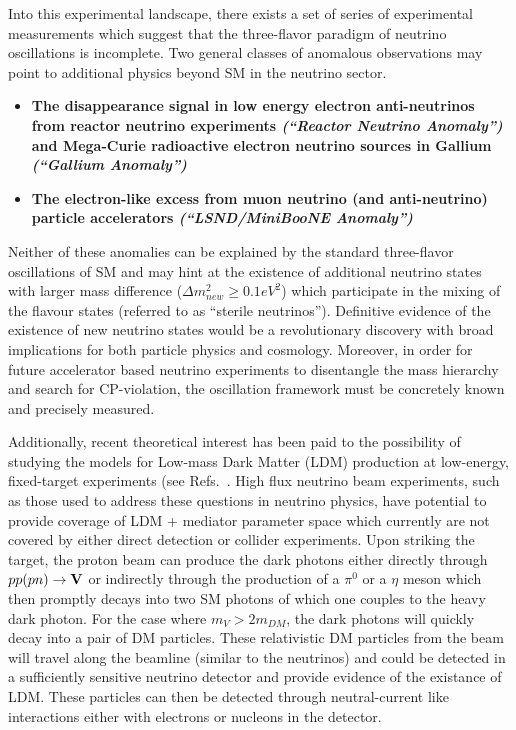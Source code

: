 Into this experimental landscape, there exists a set of series of experimental measurements which suggest that the three-flavor paradigm of neutrino oscillations is incomplete. Two general classes of anomalous observations may point to additional physics beyond SM  in the neutrino sector.

\begin{itemize}
\item \textbf{The disappearance signal in low energy electron anti-neutrinos from reactor neutrino experiments \cite{No13} \textit{(``Reactor Neutrino Anomaly'')} and Mega-Curie radioactive electron neutrino sources in Gallium \cite{No14, No15} \textit{(``Gallium Anomaly'')}}

\item \textbf{The electron-like excess from muon neutrino (and anti-neutrino) particle accelerators \textit{(``LSND/MiniBooNE Anomaly'')} \cite{No16, No17}}

\end{itemize}

Neither of these anomalies can be explained by the standard three-flavor oscillations of SM and may hint at the existence of additional neutrino states with larger mass difference ($\Delta m_{new}^{2}\geq 0.1 eV^{2}$) which participate in the mixing of the flavour states (referred to as ``sterile neutrinos''). Definitive evidence of the existence of new neutrino states would be a revolutionary discovery with broad implications for both particle physics and cosmology. Moreover, in order for future accelerator based neutrino experiments to disentangle the mass hierarchy and search for CP-violation, the oscillation framework must be concretely known and precisely measured.

Additionally, recent theoretical interest has been paid to the possibility of studying the models for Low-mass Dark Matter (LDM) production at low-energy, fixed-target experiments (see Refs.~\cite{if:ldm-1, if:ldm-2,if:ldm-3, if:ldm-4)}.  High flux neutrino beam experiments, such as those used to address these questions in neutrino physics, have potential to provide coverage of LDM + mediator parameter space which currently are not covered by either direct detection or collider experiments. Upon striking the target, the proton beam can produce the dark photons either directly through $pp(pn)\rightarrow \bf {V}$ or indirectly through the production of a $\pi^{0}$ or a $\eta$ meson which then promptly decays into two SM photons of which one couples to the heavy dark photon. For the case where $m_{V} > 2m_{DM}$, the dark photons will quickly decay into a pair of DM particles.  These relativistic DM particles from the beam will travel along the beamline (similar to the neutrinos) and could be detected in a sufficiently sensitive neutrino detector and provide evidence of the existance of LDM. These particles can then be detected through neutral-current like interactions either with electrons or nucleons in the detector.

